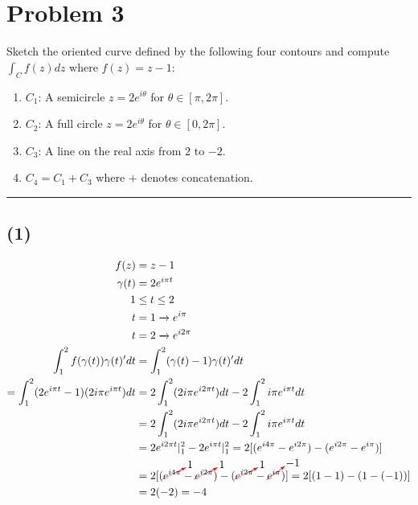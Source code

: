 \documentclass{article}
\newcommand{\canceling}[2]{\textcolor{red}{\cancelto{\textcolor{black}{#1}}{\textcolor{black}{#2}}}}
\begin{document}
\section*{Problem 3}
Sketch the oriented curve defined by the following four contours and compute $\int_{C}f(z) dz$ where $f (z) = z-1$:
\begin{enumerate}
\item $C_1$: A semicircle $z=2e^{i\theta}$ for $\theta\in [\pi, 2\pi]$.
\item $C_2$: A full circle $z=2e^{i\theta}$  for $\theta\in [0, 2\pi]$.
\item $C_3$: A line on the real axis from $2$ to $-2$.
\item $C_4 = C_1+C_3$ where $+$ denotes concatenation.
\end{enumerate}

\vspace{.5cm} %

\hrule
\subsection*{(1)}
\begin{center}
\end{center}
\vspace{.5cm} %
\begin{align*}
f(z) &= z-1 \\
  \gamma(t) &= 2e^{i\pi t}\\
  1 &\leq t \leq 2\\
  t &= 1 \xrightarrow{} e^{i\pi}\\
  t &= 2 \xrightarrow{} e^{i2\pi}\\
  \int_1^{2}f(\gamma(t))\gamma(t)'dt &=  \int_1^{2}(\gamma(t)-1)\gamma(t)'dt\\
  =  \int_1^{2}(2e^{i\pi t}-1)(2i\pi e^{i\pi t})dt &=  2\int_1^{2}(2i\pi e^{i2\pi t})dt- 2\int_1^{2}i\pi e^{i\pi t}dt\\
     &=  2\int_1^{2}(2i\pi e^{i2\pi t})dt- 2\int_1^{2}i\pi e^{i\pi t}dt\\
     &= 2e^{i2\pi t}|_1^2 - 2e^{i\pi t}|_1^2 = 2[(e^{i4\pi}-e^{i2\pi}) - (e^{i2\pi}-e^{i\pi})]\\
     &= 2[(\canceling{1}{e^{i4\pi}}-\canceling{1}{e^{i2\pi}}) - (\canceling{1}{e^{i2\pi}}-\canceling{-1}{e^{i\pi}})] = 2[(1-1) - (1-(-1))] \\
  &= 2(-2) = -4
\end{align*}
\end{document}

